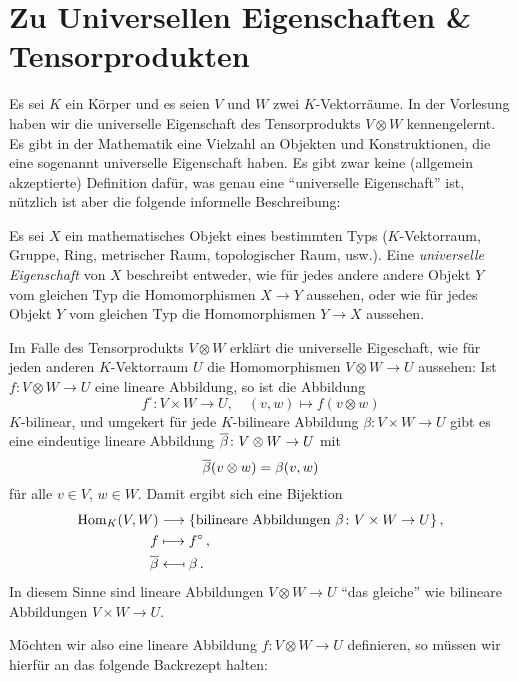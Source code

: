 \section*{Zu Universellen Eigenschaften \& Tensorprodukten}

Es sei $K$ ein Körper und es seien $V$ und $W$ zwei $K$-Vektorräume.
In der Vorlesung haben wir die universelle Eigenschaft des Tensorprodukts $V \otimes W$ kennengelernt.
Es gibt in der Mathematik eine Vielzahl an Objekten und Konstruktionen, die eine sogenannt universelle Eigenschaft haben.
Es gibt zwar keine (allgemein akzeptierte) Definition dafür, was genau eine \enquote{universelle Eigenschaft} ist, nützlich ist aber die folgende informelle Beschreibung:
 
\begin{idea}
  Es sei $X$ ein mathematisches Objekt eines bestimmten Typs ($K$-Vektorraum, Gruppe, Ring, metrischer Raum, topologischer Raum, usw.).
  Eine \emph{universelle Eigenschaft} von $X$ beschreibt entweder, wie für jedes andere andere Objekt $Y$ vom gleichen Typ die Homomorphismen $X \to Y$ aussehen, oder wie für jedes Objekt $Y$ vom gleichen Typ die Homomorphismen $Y \to X$ aussehen.
\end{idea}

Im Falle des Tensorprodukts $V \otimes W$ erklärt die universelle Eigeschaft, wie für jeden anderen $K$-Vektorraum $U$ die Homomorphismen $V \otimes W \to U$ aussehen:
Ist $f \colon V \otimes W \to U$ eine lineare Abbildung, so ist die Abbildung
\[
          f^\circ
  \colon  V \times W
  \to     U,
  \quad   (v,w)
  \mapsto f(v \otimes w)
\]
$K$-bilinear, und umgekert für jede $K$-bilineare Abbildung $\beta \colon V \times W \to U$ gibt es eine eindeutige lineare Abbildung $\overline{\beta} \colon V \otimes W \to U$ mit
\[
    \overline{\beta}(v \otimes w)
  = \beta(v,w)
\]
für alle $v \in V$, $w \in W$.
Damit ergibt sich eine Bijektion
\begin{align*}
                    \operatorname{Hom}_K(V,W)
  &\longrightarrow  \{ \text{bilineare Abbildungen $\beta \colon V \times W \to U$} \} \,,  \\
                    f
  &\longmapsto      f^\circ \,, \\
                    \overline{\beta}
  &\longmapsfrom    \beta \,.
\end{align*}
In diesem Sinne sind lineare Abbildungen $V \otimes W \to U$ \enquote{das gleiche} wie bilineare Abbildungen $V \times W \to U$.

Möchten wir also eine lineare Abbildung $f \colon V \otimes W \to U$ definieren, so müssen wir hierfür an das folgende Backrezept halten:

